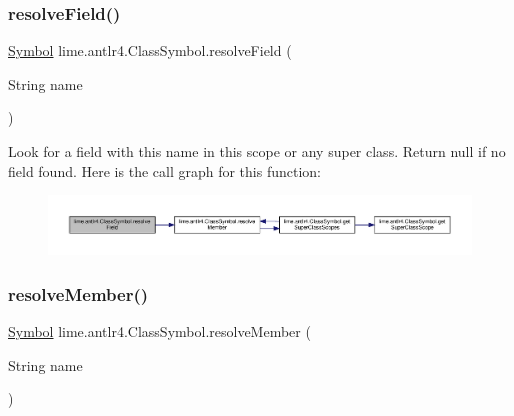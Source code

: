\subsubsection{\texorpdfstring{resolve\+Field()}{resolveField()}}
{\footnotesize\ttfamily \hyperlink{interfacelime_1_1antlr4_1_1Symbol}{Symbol} lime.\+antlr4.\+Class\+Symbol.\+resolve\+Field (\begin{DoxyParamCaption}\item[{String}]{name }\end{DoxyParamCaption})}

Look for a field with this name in this scope or any super class. Return null if no field found. Here is the call graph for this function\+:
\nopagebreak
\begin{figure}[H]
\begin{center}
\leavevmode
\includegraphics[width=350pt]{classlime_1_1antlr4_1_1ClassSymbol_a3b5e6abcf9e0c8be368f0aa77f58db1e_cgraph}
\end{center}
\end{figure}
\mbox{\label{classlime_1_1antlr4_1_1ClassSymbol_a6bf9bcc8721faa0f5c61b9134e8ddf37}} 
\subsubsection{\texorpdfstring{resolve\+Member()}{resolveMember()}}
{\footnotesize\ttfamily \hyperlink{interfacelime_1_1antlr4_1_1Symbol}{Symbol} lime.\+antlr4.\+Class\+Symbol.\+resolve\+Member (\begin{DoxyParamCaption}\item[{String}]{name }\end{DoxyParamCaption})}

